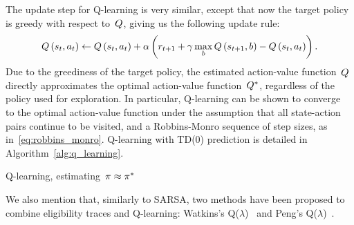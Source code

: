 The update step for Q-learning is very similar, except that now the target policy is greedy with respect to~${\estimateactionvalue}$, giving us the following update rule:
\begin{equation}
	\estimateactionvalue\left(\randomstate_{\timestep},\randomaction_{\timestep}\right)\gets\estimateactionvalue\left(\randomstate_{\timestep},\randomaction_{\timestep}\right)+\robbinsmonro\left(\randomreward_{\timestep+1}+\discount\max_{\varaction}\estimateactionvalue\left(\randomstate_{\timestep+1},\varaction\right)-\estimateactionvalue\left(\randomstate_{\timestep},\randomaction_{\timestep}\right)\right).
\end{equation}
Due to the greediness of the target policy, the estimated action-value function~${\estimateactionvalue}$ directly approximates the optimal action-value function~${Q^{*}}$, regardless of the policy used for exploration. In particular, Q-learning can be shown to converge~{\cite{watkins1992qlearning, jaakkola1994, tsitsiklis1994}} to the optimal action-value function under the assumption that all state-action pairs continue to be visited, and a Robbins-Monro sequence of step sizes, as in~\eqref{eq:robbins_monro}. Q-learning with TD(0) prediction is detailed in Algorithm~\ref{alg:q_learning}.
\begin{algorithm}
	\caption{Q-learning, estimating~${\pi\approx\pi^{*}}$}
	\label{alg:q_learning}

\end{algorithm}
We also mention that, similarly to SARSA, two methods have been proposed to combine eligibility traces and Q-learning: Watkins's Q(${\lambda}$)~\cite{watkins1989learning} and Peng's Q(${\lambda}$)~\cite{peng1996}.

